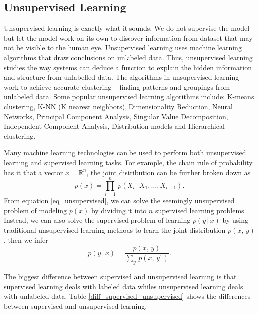\documentclass[master]{thesis-uestc}
\begin{document}
\subsection{Unsupervised Learning}
Unsupervised learning is exactly what it sounds. We do not supervise the model but let the model work on its own to discover information from dataset that may not be visible to the human eye. Unsupervised learning uses machine learning algorithms that draw conclusions on unlabeled data. Thus, unsupervised learning studies the way systems can deduce a function to explain the hidden information and structure from unlabelled data. The algorithms in unsupervised learning work to achieve accurate clustering – finding patterns and groupings from unlabeled data. Some popular unsupervised learning algorithms include: K-means clustering, K-NN (K nearest neighbors), Dimensionality Reduction, Neural Networks, Principal Component Analysis, Singular Value Decomposition, Independent Component Analysis, Distribution models and Hierarchical clustering.

Many machine learning technologies can be used to perform both unsupervised learning and supervised learning tasks. For example, the chain rule of probability has it that a vector $x = \mathbb{R}^n$, the joint distribution can be further broken down as
\begin{equation}
    p(x) = {\displaystyle \prod_{i=1}^{n}}\,p(X_i\,|\,X_1,\dots,X_{i-1}).
    \label{eq_unsupervised}
\end{equation}
From equation \ref{eq_unsupervised}, we can solve the seemingly unsupervised problem of modeling $p(x)$ by dividing it into $n$ supervised learning problems. Instead, we can also solve the supervised problem of learning $p(y\,|\,x)$ by using traditional unsupervised learning methods to learn the joint distribution $p(x,\,y)$, then we infer
\begin{equation}
    p(y\,|\,x) = \frac{p(x,\,y)}{\sum_y\,p(x,\,y^1)}.
\end{equation}

The biggest difference between supervised and unsupervised learning is that supervised learning deals with labeled data whiles unsupervised learning deals with unlabeled data. Table \ref{diff_supervised_unsupervised} shows the differences between supervised and unsupervised learning.
\end{document}
